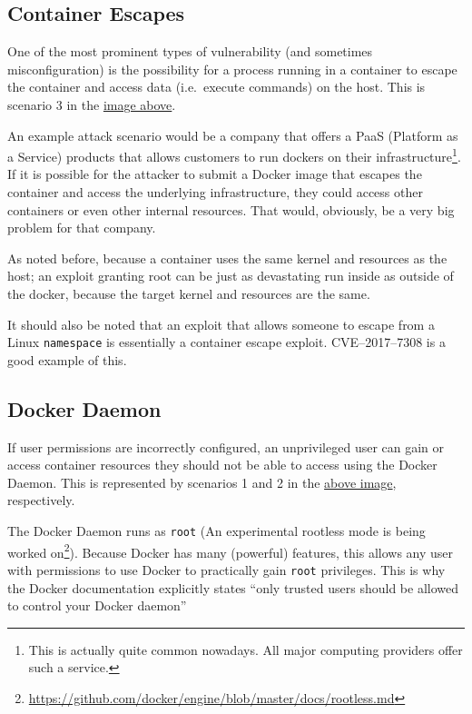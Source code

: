 \subsection{Container Escapes}
One of the most prominent types of vulnerability (and sometimes misconfiguration) is the possibility for a process running in a container to escape the container and access data (i.e.\ execute commands) on the host. This is scenario 3 in the \href{fig:attacksurfaces}{image above}.

\hfill

An example attack scenario would be a company that offers a PaaS (Platform as a Service) products that allows customers to run dockers on their infrastructure\footnote{This is actually quite common nowadays. All major computing providers offer such a service.}. If it is possible for the attacker to submit a Docker image that escapes the container and access the underlying infrastructure, they could access other containers or even other internal resources. That would, obviously, be a very big problem for that company.

\hfill

As noted before, because a container uses the same kernel and resources as the host; an exploit granting root can be just as devastating run inside as outside of the docker, because the target kernel and resources are the same.

It should also be noted that an exploit that allows someone to escape from a Linux \lstinline{namespace} is essentially a container escape exploit. CVE--2017--7308\cite{cve20177308} is a good example of this.

\subsection{Docker Daemon}
If user permissions are incorrectly configured, an unprivileged user can gain or access container resources they should not be able to access using the Docker Daemon. This is represented by scenarios 1 and 2 in the \href{fig:attacksurfaces}{above image}, respectively.

\hfill

The Docker Daemon runs as \lstinline{root} (An experimental rootless mode is being worked on\footnote{\url{https://github.com/docker/engine/blob/master/docs/rootless.md}}). Because Docker has many (powerful) features, this allows any user with permissions to use Docker to practically gain \lstinline{root} privileges. This is why the Docker documentation explicitly states ``only trusted users should be allowed to control your Docker daemon''\cite{dockerdaemonattacksurface}

